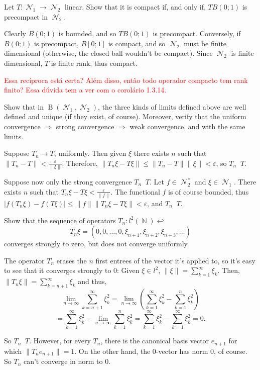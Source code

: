 \documentclass{article}
\theoremstyle{exercisestyle}
\newenvironment{exercise}[1]
  {\renewcommand\theinnerex{#1}\innerex}
  {\endinnerex}
\DeclareMathOperator{\bounded}{B}
\newcommand{\norm}[1]{\lVert #1 \rVert}
\newcommand{\openball}[2]{B\left(#1;#2\right)}
\newcommand{\ball}[2]{\openball{#1}{#2}}
\newcommand{\closedball}[2]{B\left[#1;#2\right]}
\DeclareMathOperator{\Natural}{\mathbb{N}}
\DeclareMathOperator{\normed}{\mathcal{N}}
\DeclareMathOperator{\strongly}{\stackrel{s}{\longrightarrow}}
\DeclareMathOperator{\weakly}{\stackrel{w}{\longrightarrow}}
\begin{document}
\begin{exercise}{1.3.12}
    Let $T : \normed_1 \to \normed_2$ linear. Show that it is compact if, and only if, $T \ball{0}{1}$ is precompact in $\normed_2$.

    Clearly $\ball{0}{1}$ is bounded, and so $T \ball{0}{1}$ is precompact. Conversely, if $\ball{0}{1}$ is precompact, $\closedball{0}{1}$ is compact, and so $\normed_2$
    must be finite dimensional (otherwise, the closed ball wouldn't be compact). Since $\normed_2$ is finite dimensional, $T$ is finite rank, thus compact.

    \textcolor{red}{Essa recíproca está certa? Além disso, então todo operador compacto tem rank finito? Essa dúvida tem a ver com o corolário 1.3.14.}


\end{exercise}

\begin{exercise}{1.3.16}
    Show that in $\bounded(\normed_1 , \normed_2 )$, the three kinds of limits defined above
    are well defined and unique (if they exist, of course). Moreover, verify that the
    uniform convergence $\Rightarrow$ strong convergence $\Rightarrow$ weak convergence, and with the
    same limits.

    Suppose $T_n \to T$, uniformly. Then given $\xi$ there exists $n$ such that $\norm{T_n - T} < \frac{\varepsilon}{\norm{\xi}}$.
    Therefore, $\norm{T_n \xi - T \xi} \leq \norm{T_n - T}\norm{\xi} < \varepsilon$, so $T_n \strongly T$.

    Suppose now only the strong convergence $T_n \strongly T$. Let $f \in \normed_2^*$ and $\xi \in \normed_1$. There exists $n$ such that $T_n \xi - T \xi < \frac{\varepsilon}{\norm{f}}$.
    The functional $f$ is of course bounded, thus $|f(T_n \xi) - f(T \xi)| \leq \norm{f} \norm{T_n \xi - T \xi} < \varepsilon$, and $T_n \weakly T$.

\end{exercise}

\begin{exercise}{1.3.18}
    Show that the sequence of operators $T_n : l^2 (\Natural) \hookleftarrow$
    $$ T_n \xi = \left(0, 0, \dots, 0, \xi_{n+1} , \xi_{n+2} , \xi_{n+3}, \dots \right)$$
    converges strongly to zero, but does not converge uniformly.


    The operator $T_n$ erases the $n$ first entrees of the vector it's applied to, so it's easy to see that it converges strongly to 0: Given $\xi \in l^2$, $\norm{\xi} = \sum_{k=1}^\infty \xi_k$. Then, $\norm{T_n \xi} = \sum_{k=n+1}^\infty \xi_k$ and thus,
    $$\lim_{n\to\infty} \sum_{k=n+1}^\infty \xi_k^2 = \lim_{n\to\infty} \left(\sum_{k=1}^\infty \xi_k^2 - \sum_{k=1}^{n} \xi_k^2 \right)$$
    $$ = \sum_{k=1}^\infty \xi_k^2 - \lim_{n\to\infty}\sum_{k=1}^{n} \xi_k^2= \sum_{k=1}^\infty \xi_k^2 - \sum_{k=1}^\infty \xi_k^2 = 0.$$

    So $T_n \strongly T$. However, for every $T_n$, there is the canonical basis vector $e_{n+1}$ for which $\norm{T_n e_{n+1}} = 1$. On the other hand, the 0-vector   has norm $0$, of course.
    So $T_n$ can't converge in norm to $0$.

\end{exercise}
\end{document}
